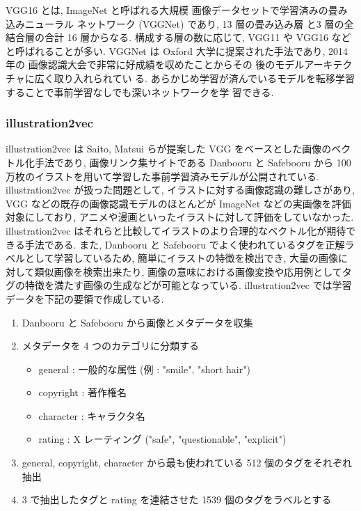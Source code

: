 VGG16 \cite{brusilovsky:simonyan2014very} とは, ImageNet と呼ばれる大規模
画像データセットで学習済みの畳み込みニューラル
ネットワーク (VGGNet) であり, 13 層の畳み込み層
と3 層の全結合層の合計 16 層からなる. 構成する層の数に応じて, VGG11 や VGG16 などと呼ばれることが多い. VGGNet は Oxford 大学に提案された手法であり, 2014 年の
画像認識大会で非常に好成績を収めたことからその
後のモデルアーキテクチャに広く取り入れられてい
る. あらかじめ学習が済んでいるモデルを転移学習
することで事前学習なしでも深いネットワークを学
習できる.

\changeindent{0cm}
\subsubsection{illustration2vec}
\changeindent{2cm}

illustration2vec \cite{i2v} は Saito, Matsui らが提案した VGG をベースとした画像のベクトル化手法であり, 画像リンク集サイトである Danbooru と Safebooru から 100 万枚のイラストを用いて学習した事前学習済みモデルが公開されている. illustration2vec が扱った問題として, イラストに対する画像認識の難しさがあり, VGG などの既存の画像認識モデルのほとんどが ImageNet などの実画像を評価対象にしており, アニメや漫画といったイラストに対して評価をしていなかった. illustration2vec はそれらと比較してイラストのより合理的なベクトル化が期待できる手法である. また, Danbooru と Safebooru でよく使われているタグを正解ラベルとして学習しているため, 簡単にイラストの特徴を検出でき, 大量の画像に対して類似画像を検索出来たり, 画像の意味における画像変換や応用例としてタグの特徴を満たす画像の生成などが可能となっている.
\newpage
illustration2vec では学習データを下記の要領で作成している.

\begin{enumerate}
  \item Danbooru と Safebooru から画像とメタデータを収集
  \item メタデータを 4 つのカテゴリに分類する
        \begin{itemize}
          \item general : 一般的な属性 (例 : "smile", "short hair")
          \item copyright : 著作権名
          \item character : キャラクタ名
          \item rating : X レーティング ("safe", "questionable", "explicit")
        \end{itemize}
  \item general, copyright, character から最も使われている 512 個のタグをそれぞれ抽出
  \item 3 で抽出したタグと rating を連結させた 1539 個のタグをラベルとする
\end{enumerate}
